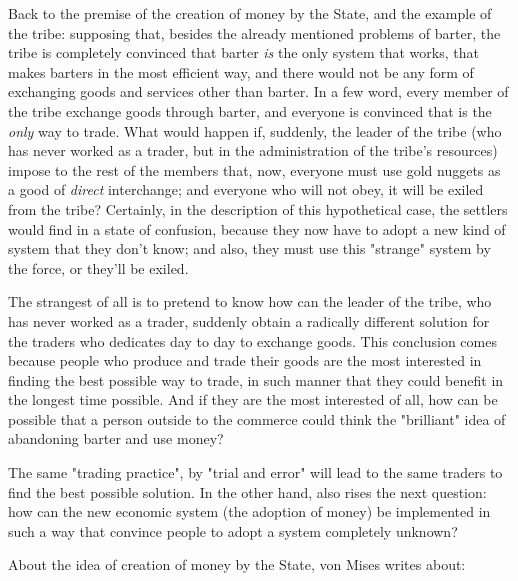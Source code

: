 \documentclass[12pt,a4paper,twoside]{book}
\begin{document}
Back to the premise of the creation of money by the State, and the example of the tribe: supposing that, besides the already mentioned problems of barter, the tribe is completely convinced that barter \textit{is} the only system that works, that makes barters in the most efficient way, and there would not be any form of exchanging goods and services other than barter. In a few word, every member of the tribe exchange goods through barter, and everyone is convinced that is the \textit{only} way to trade. What would happen if, suddenly, the leader of the tribe (who has never worked as a trader, but in the administration of the tribe's resources) impose to the rest of the members that, now, everyone must use gold nuggets as a good of \textit{direct} interchange; and everyone who will not obey, it will be exiled from the tribe? Certainly, in the description of this hypothetical case, the settlers would find in a state of confusion, because they now have to adopt a new kind of system that they don't know; and also, they must use this "strange" system by the force, or they'll be exiled.

The strangest of all is to pretend to know how can the leader of the tribe, who has never worked as a trader, suddenly obtain a radically different solution for the traders who dedicates day to day to exchange goods. This conclusion comes because people who produce and trade their goods are the most interested in finding the best possible way to trade, in such manner that they could benefit in the longest time possible. And if they are the most interested of all, how can be possible that a person outside to the commerce could think the "brilliant" idea of abandoning barter and use money?

The same "trading practice", by "trial and error" will lead to the same traders to find the best possible solution. In the other hand, also rises the next question: how can the new economic system (the adoption of money) be implemented in such a way that convince people to adopt a system completely unknown?

About the idea of creation of money by the State, von Mises writes about:
\end{document}
